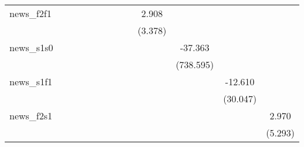 {\begin{tabular}{l*{12}{c}}
\addlinespace
news\_f2f1   &                     &                     &                     &                     &                     &                     &                     &                     &       2.908         &                     &                     &                     \\
            &                     &                     &                     &                     &                     &                     &                     &                     &     (3.378)         &                     &                     &                     \\
\addlinespace
news\_s1s0   &                     &                     &                     &                     &                     &                     &                     &                     &                     &     -37.363         &                     &                     \\
            &                     &                     &                     &                     &                     &                     &                     &                     &                     &   (738.595)         &                     &                     \\
\addlinespace
news\_s1f1   &                     &                     &                     &                     &                     &                     &                     &                     &                     &                     &     -12.610         &                     \\
            &                     &                     &                     &                     &                     &                     &                     &                     &                     &                     &    (30.047)         &                     \\
\addlinespace
news\_f2s1   &                     &                     &                     &                     &                     &                     &                     &                     &                     &                     &                     &       2.970         \\
            &                     &                     &                     &                     &                     &                     &                     &                     &                     &                     &                     &     (5.293)         \\

\end{tabular}}
